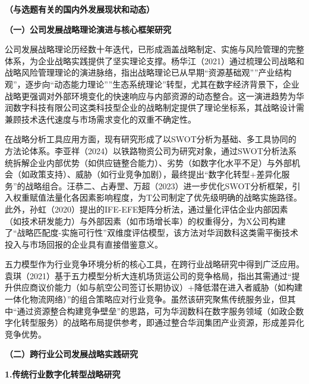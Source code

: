 \documentclass[UTF8, a4paper, 11pt]{ctexart}
\begin{document}
\vspace{0.6cm}

\begin{UnifiedBox}
\setlength{\parindent}{2em}

\noindent \textbf{（与选题有关的国内外发展现状和动态）}

\vspace{0.3cm}
\noindent \textbf{（一）公司发展战略理论演进与核心框架研究}

\vspace{0.2cm}
公司发展战略理论历经数十年迭代，已形成涵盖战略制定、实施与风险管理的完整体系，为企业战略实践提供了坚实理论支撑。杨华江（2021）通过梳理公司战略和战略风险管理理论的演进脉络，指出战略理论已从早期``资源基础观''''产业结构观''，逐步向``动态能力理论''''生态系统理论''转型，尤其在数字经济背景下，企业战略更强调对外部环境变化的快速响应与内部资源的动态整合。这一演进趋势为华润数字科技有限公司这类科技型企业的战略制定提供了理论坐标系，其战略设计需兼顾技术迭代速度与市场需求变化的双重不确定性。

在战略分析工具应用方面，现有研究形成了以SWOT分析为基础、多工具协同的方法论体系。李亚祥（2024）以铁路物资公司为研究对象，通过SWOT分析法系统拆解企业内部优势（如供应链整合能力）、劣势（如数字化水平不足）与外部机会（如政策支持）、威胁（如行业竞争加剧），最终提出``数字化转型+差异化服务''的战略组合。汪恭二、占寿罡、万超（2023）进一步优化SWOT分析框架，引入权重赋值法量化各因素影响程度，为T公司制定了优先级明确的战略实施路径。此外，孙虹（2020）提出的IFE-EFE矩阵分析法，通过量化评估企业内部因素（如技术研发能力）与外部因素（如市场增长率）的权重得分，为X公司构建了``战略匹配度-实施可行性''双维度评估模型，该方法对华润数科这类需平衡技术投入与市场回报的企业具有直接借鉴意义。

五力模型作为行业竞争环境分析的核心工具，在跨行业战略研究中得到广泛应用。袁琪（2021）基于五力模型分析大连机场货运公司的竞争格局，指出其需通过``提升供应商议价能力（如与航空公司签订长期协议）+降低潜在进入者威胁（如构建一体化物流网络）''的组合策略应对行业竞争。虽然该研究聚焦传统服务业，但其中``通过资源整合构建竞争壁垒''的思路，可为华润数科在数字服务领域（如政企数字化转型服务）的战略布局提供参考，即通过整合华润集团产业资源，形成差异化竞争优势。

\vspace{0.3cm}
\noindent \textbf{（二）跨行业公司发展战略实践研究}

\vspace{0.2cm}
\noindent \textbf{1.传统行业数字化转型战略研究}


\end{UnifiedBox}
\end{document}
